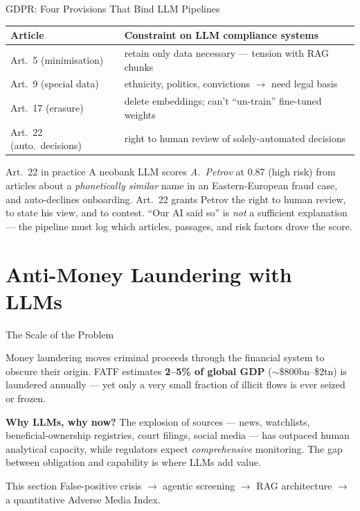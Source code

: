 \documentclass[9pt,t]{beamer}
\begin{document}
\begin{frame}{GDPR: Four Provisions That Bind LLM Pipelines}
\begin{tabular}{ll}
\toprule
\textbf{Article} & \textbf{Constraint on LLM compliance systems} \\
\midrule
Art.\ 5 (minimisation) & retain only data necessary --- tension with RAG chunks \\
Art.\ 9 (special data) & ethnicity, politics, convictions $\to$ need legal basis \\
Art.\ 17 (erasure) & delete embeddings; can't ``un-train'' fine-tuned weights \\
Art.\ 22 (auto.\ decisions) & right to human review of solely-automated decisions \\
\bottomrule
\end{tabular}

\medskip
\begin{exampleblock}{Art.\ 22 in practice}
A neobank LLM scores \emph{A.\ Petrov} at 0.87 (high risk) from articles about a
\emph{phonetically similar} name in an Eastern-European fraud case, and
auto-declines onboarding. Art.\ 22 grants Petrov the right to human review, to
state his view, and to contest. ``Our AI said so'' is \emph{not} a sufficient
explanation --- the pipeline must log which articles, passages, and risk factors
drove the score.
\end{exampleblock}
\end{frame}

\section{Anti-Money Laundering with LLMs}

\begin{frame}{The Scale of the Problem}
\begin{bigpicture}
Money laundering moves criminal proceeds through the financial system to obscure
their origin. FATF estimates \textbf{2--5\% of global GDP} ($\sim$\$800bn--\$2tn)
is laundered annually --- yet only a very small fraction of illicit flows is ever
seized or frozen.
\end{bigpicture}

\medskip
\textbf{Why LLMs, why now?} The explosion of sources --- news, watchlists,
beneficial-ownership registries, court filings, social media --- has outpaced
human analytical capacity, while regulators expect \emph{comprehensive}
monitoring. The gap between obligation and capability is where LLMs add value.

\medskip
\begin{block}{This section}
False-positive crisis $\to$ agentic screening $\to$ RAG architecture $\to$ a
quantitative Adverse Media Index.
\end{block}
\end{frame}
\end{document}
